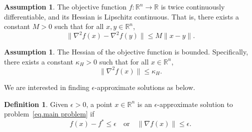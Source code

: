 \documentclass{article}
\theoremstyle{plain}
\theoremstyle{definition}
\newtheorem{definition}[theorem]{Definition}
\newtheorem{assumption}[theorem]{Assumption}
\theoremstyle{remark}
\begin{document}
\begin{assumption}
    \label{assm.main assm}
    The objective function $f: \mathbb{R}^n \to \mathbb{R}$ is twice continuously differentiable, and its Hessian is Lipschitz continuous. That is, there exists a constant $M > 0$ such that for all $x, y \in \mathbb{R}^n$,
    \begin{equation}
        \label{eq.main assm}
        \|\nabla^2 f(x) - \nabla^2 f(y)\| \leq M \|x - y\|. \end{equation}
\end{assumption}

\begin{assumption}
    \label{assm.bounded hessian}
    The Hessian of the objective function is bounded. Specifically, there exists a constant $\kappa_H > 0$ such that for all $x \in \mathbb{R}^n$, \begin{equation}
        \label{eq.bounded hessian}
        \|\nabla^2 f(x)\| \leq \kappa_H.
    \end{equation} \end{assumption}


We are interested in finding $\epsilon$-approximate solutions as below.

\begin{definition}
    \label{def.approximate solution}
    Given $\epsilon > 0$, a point $x \in \mathbb{R}^n$ is an $\epsilon$-approximate solution to problem~\eqref{eq.main problem} if
    \begin{equation}
        \label{eq.approximate solution}
        f(x) - f^* \leq \epsilon \quad \text{or} \quad \|\nabla f(x)\| \leq \epsilon.
    \end{equation}
\end{definition}
\end{document}

